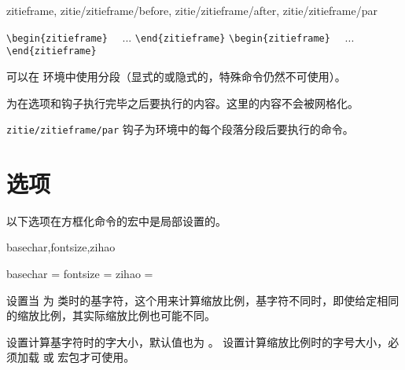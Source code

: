 \documentclass{ctxdoc}
\begin{document}
\begin{function}{zitieframe,
  zitie/zitieframe/before, zitie/zitieframe/after,
  zitie/zitieframe/par
}
  \begin{syntax}
    \verb|\begin{zitieframe}| 
    ~~...
    \verb|\end{zitieframe}|
    \verb|\begin{zitieframe}|  
    ~~...
    \verb|\end{zitieframe}|
  \end{syntax}
  可以在  环境中使用分段（显式的或隐式的，特殊命令仍然不可使用）。

   为在选项和钩子执行完毕之后要执行的内容。这里的内容不会被网格化。

  \verb|zitie/zitieframe/par| 钩子为环境中的每个段落分段后要执行的命令。
\end{function}

\section{选项}\label{sec:options}

以下选项在方框化命令的宏中是局部设置的。

\begin{function}{basechar,fontsize,zihao}
  \begin{syntax}
    basechar =  
    fontsize =  \init{\normalsize}
    zihao = 
  \end{syntax}
   设置当  为  类时的基字符，这个用来计算缩放比例，基字符不同时，即使给定相同的缩放比例，其实际缩放比例也可能不同。

   设置计算基字符时的字大小，默认值也为 。 设置计算缩放比例时的字号大小，必须加载  或  宏包才可使用。
\end{function}
\end{document}
